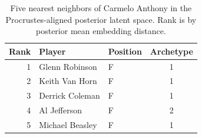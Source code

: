\begin{table}[htbp]
  \centering\small
  \begin{tabular}{rllc}
    \toprule
    Rank & Player & Position & Archetype \\
    \midrule
    1 & Glenn Robinson & F & 1 \\
    2 & Keith Van Horn & F & 1 \\
    3 & Derrick Coleman & F & 1 \\
    4 & Al Jefferson & F & 2 \\
    5 & Michael Beasley & F & 1 \\
    \bottomrule
  \end{tabular}
  \caption{Five nearest neighbors of Carmelo Anthony in the Procrustes-aligned posterior latent space. Rank is by posterior mean embedding distance.}
  \label{tab:Carmelo_Anthony_neighbors}
\end{table}

